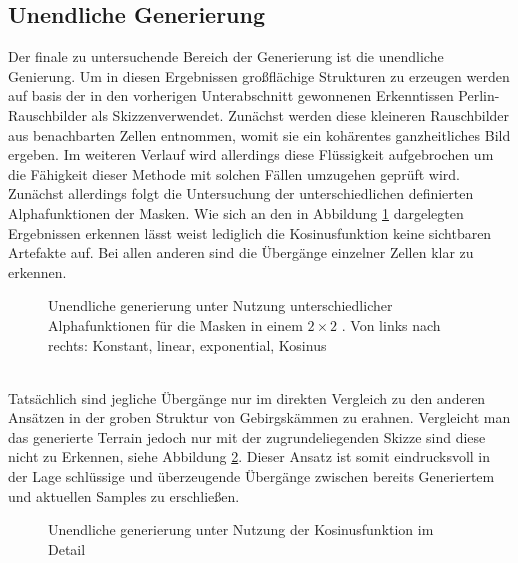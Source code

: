 \subsection {Unendliche Generierung}

Der finale zu untersuchende Bereich der Generierung ist die unendliche Genierung. Um in diesen Ergebnissen großflächige Strukturen zu erzeugen werden auf basis der in den vorherigen Unterabschnitt gewonnenen Erkenntissen Perlin-Rauschbilder als Skizzenverwendet. Zunächst werden diese kleineren Rauschbilder aus benachbarten Zellen entnommen, womit sie ein kohärentes ganzheitliches Bild ergeben. Im weiteren Verlauf wird allerdings diese Flüssigkeit aufgebrochen um die Fähigkeit dieser Methode mit solchen Fällen umzugehen geprüft wird. \\
Zunächst allerdings folgt die Untersuchung der unterschiedlichen definierten Alphafunktionen der Masken. Wie sich an den in Abbildung \ref{fig:masks} dargelegten Ergebnissen erkennen lässt weist lediglich die Kosinusfunktion keine sichtbaren Artefakte auf. Bei allen anderen sind die Übergänge einzelner Zellen klar zu erkennen. 
\begin{figure}[htbp]
    \centering
    \caption{Unendliche generierung unter Nutzung unterschiedlicher Alphafunktionen für die Masken in einem $2\times2$ . Von links nach rechts: Konstant, linear, exponential, Kosinus}
    \label{fig:masks}
\end{figure} \\
Tatsächlich sind jegliche Übergänge nur im direkten Vergleich zu den anderen Ansätzen in der groben Struktur von Gebirgskämmen zu erahnen. Vergleicht man das generierte Terrain jedoch nur mit der zugrundeliegenden Skizze sind diese nicht zu Erkennen, siehe Abbildung \ref{fig:cos_detail}. Dieser Ansatz ist somit eindrucksvoll in der Lage schlüssige und überzeugende Übergänge zwischen bereits Generiertem und aktuellen Samples zu erschließen.
\begin{figure}[htbp]
    \centering
    \caption{Unendliche generierung unter Nutzung der Kosinusfunktion im Detail}
    \label{fig:cos_detail}
\end{figure} \\
